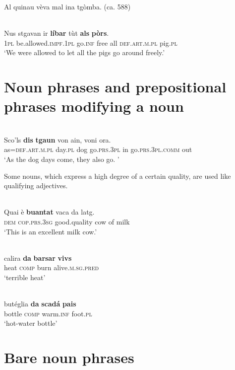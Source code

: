 {Al quinau vèva mal ina tgòmba. (ca. 588)

\ea\label{}
\\
\gll Nus stgavan ir \textbf{líbar} tùt \textbf{als} \textbf{pòrs}.   \\
 \textsc{1pl}  be.allowed.\textsc{impf.1pl}  go.\textsc{inf} free all  \textsc{def.art.m.pl} pig.\textsc{pl} \\
\glt `We were allowed to let all the pigs go around freely.'
\z




\section{Noun phrases and prepositional phrases modifying a noun}

\ea\label{}
\\
\gll  Sco’ls \textbf{dis} \textbf{tgaun} von ain, voni ora.  \\
     as=\textsc{def.art.m.pl} day.\textsc{pl} dog go.\textsc{prs.3pl} in go.\textsc{prs.3pl.comm} out\\
\glt `As the dog days come, they also go. '
\z


Some nouns, which express a high degree of a certain quality, are used like qualifying adjectives.

\ea\label{}
\\
\gll  Quai è \textbf{buantat} vaca da latg. \\
     \textsc{dem} \textsc{cop.prs.3sg} good.quality cow of milk\\
\glt `This is an excellent milk cow.'
\z

\ea\label{}
\\
\gll  calira \textbf{da} \textbf{barsar} \textbf{vivs} \\
     heat \textsc{comp} burn alive.\textsc{m.sg.pred}\\
\glt `terrible heat'
\z


\ea\label{}
\\
\gll   butéglia \textbf{da} \textbf{scadá} \textbf{pais} \\
    bottle \textsc{comp} warm.\textsc{inf} foot.\textsc{pl} \\
\glt `hot-water bottle'
\z


\section{Bare noun phrases}

}
